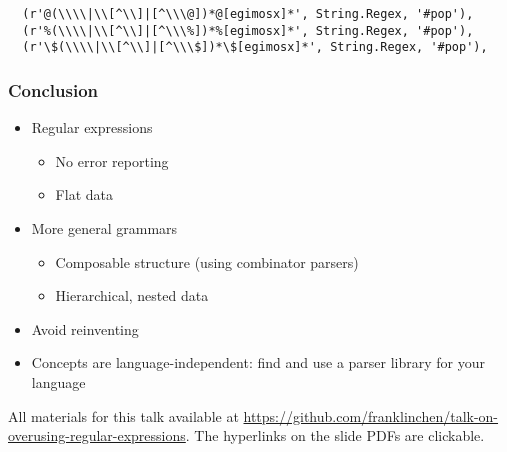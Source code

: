 \begin{frame}[fragile]
\begin{verbatim}
  (r'@(\\\\|\\[^\\]|[^\\\@])*@[egimosx]*', String.Regex, '#pop'),
  (r'%(\\\\|\\[^\\]|[^\\\%])*%[egimosx]*', String.Regex, '#pop'),
  (r'\$(\\\\|\\[^\\]|[^\\\$])*\$[egimosx]*', String.Regex, '#pop'),
  \end{verbatim}
\end{frame}

\begin{frame}
  \frametitle{Conclusion}

  \begin{itemize}
    \item Regular expressions
      \begin{itemize}
        \item No error reporting
        \item Flat data
      \end{itemize}
    \item More general grammars
      \begin{itemize}
        \item Composable structure (using combinator parsers)
        \item Hierarchical, nested data
      \end{itemize}
    \item Avoid reinventing
    \item Concepts are language-independent: find and use a parser library for your language
  \end{itemize}

  All materials for this talk available at \url{https://github.com/franklinchen/talk-on-overusing-regular-expressions}. The hyperlinks on the slide PDFs are clickable.
\end{frame}


